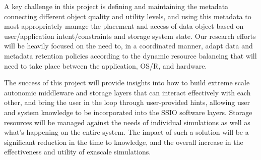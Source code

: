 \documentclass[11pt,letterpaper]{article}
\begin{document}
 
A key challenge in this project is defining and maintaining the metadata
connecting different object quality and utility levels, and using this metadata 
to most appropriately manage the placement and access of data object based on 
user/application intent/constraints and storage system state.
Our research efforts will be heavily focused on the need to, in a
coordinated manner, adapt data and metadata retention policies according to the 
dynamic resource balancing that will need to take place between the
application, OS/R, and hardware.

The success of this project will provide insights into how to build extreme scale
autonomic middleware and storage layers that can interact effectively with each
other, and bring the user in the loop through user-provided hints, allowing user 
and system knowledge to be incorporated into the SSIO software layers.
Storage resources will be managed against the needs of individual simulations 
as well as what's happening on the entire system. The impact of such a solution 
will be a significant reduction in the time to knowledge, and the overall increase in 
the effectiveness and utility of exascale simulations.




%  
\end{document}
